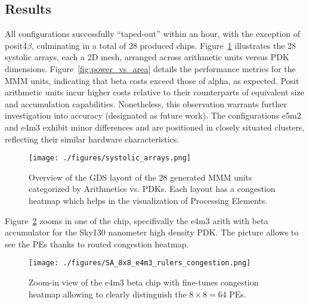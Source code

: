 \subsection{Results}
All configurations successfully ``taped-out'' within an hour, with the exception of posit4$\beta$, culminating in a total of 28 produced chips.
Figure~\ref{fig:all_arrays} illustrates the 28 systolic arrays, each a 2D mesh, arranged across arithmetic units versus PDK dimensions.
Figure~\ref{fig:power_vs_area} details the performance metrics for the MMM units, indicating that beta costs exceed those of alpha, as expected.
Posit arithmetic units incur higher costs relative to their counterparts of equivalent size and accumulation capabilities.
Nonetheless, this observation warrants further investigation into accuracy (designated as future work).
The configurations e5m2 and e4m3 exhibit minor differences and are positioned in closely situated clusters, reflecting their similar hardware characteristics.

\begin{figure}[t]
\centering
	\vspace{-0.5cm}
	\texttt{[image: ./figures/systolic\_arrays.png]}
	\caption{Overview of the GDS layout of the 28 generated MMM units categorized by Arithmetics vs. PDKs. Each layout has a congestion heatmap which helps in the visualization of Processing Elements.}
	\vspace{-0.5cm}
	\label{fig:all_arrays}
\end{figure}

Figure~\ref{fig:focus_on_e4m3} zooms in one of the chip, specifivally the e4m3 arith with beta accumulator for the Sky130 nanometer high density PDK.
The picture allows to see the PEs thanks to routed congestion heatmap.

\begin{figure}[t]
\centering
	\texttt{[image: ./figures/SA\_8x8\_e4m3\_rulers\_congestion.png]}
	\caption{Zoom-in view of the e4m3 beta chip with fine-tunes congestion heatmap allowing to clearly distinguish the $8\times8=64$ PEs.}
	\vspace{-0.5cm}
	\label{fig:focus_on_e4m3}
\end{figure}
